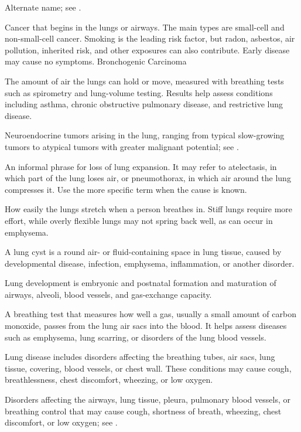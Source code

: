  Alternate name; see .

 Cancer that begins in the lungs or airways. The main types are small-cell and non-small-cell cancer. Smoking is the leading risk factor, but radon, asbestos, air pollution, inherited risk, and other exposures can also contribute. Early disease may cause no symptoms.
\synonyms
Bronchogenic Carcinoma

 The amount of air the lungs can hold or move, measured with breathing tests such as spirometry and lung-volume testing. Results help assess conditions including asthma, chronic obstructive pulmonary disease, and restrictive lung disease.

 Neuroendocrine tumors arising in the lung, ranging from typical slow-growing tumors to atypical tumors with greater malignant potential; see .

 An informal phrase for loss of lung expansion. It may refer to atelectasis, in which part of the lung loses air, or pneumothorax, in which air around the lung compresses it. Use the more specific term when the cause is known.

 How easily the lungs stretch when a person breathes in. Stiff lungs require more effort, while overly flexible lungs may not spring back well, as can occur in emphysema.

 A lung cyst is a round air- or fluid-containing space in lung tissue, caused by developmental disease, infection, emphysema, inflammation, or another disorder.

 Lung development is embryonic and postnatal formation and maturation of airways, alveoli, blood vessels, and gas-exchange capacity.

 A breathing test that measures how well a gas, usually a small amount of carbon monoxide, passes from the lung air sacs into the blood. It helps assess diseases such as emphysema, lung scarring, or disorders of the lung blood vessels.

 Lung disease includes disorders affecting the breathing tubes, air sacs, lung tissue, covering, blood vessels, or chest wall. These conditions may cause cough, breathlessness, chest discomfort, wheezing, or low oxygen.

 Disorders affecting the airways, lung tissue, pleura, pulmonary blood vessels, or breathing control that may cause cough, shortness of breath, wheezing, chest discomfort, or low oxygen; see .

